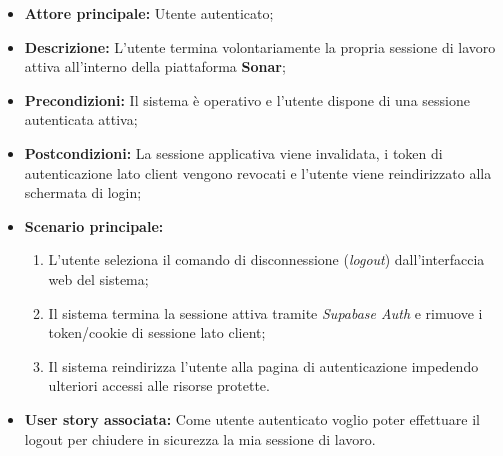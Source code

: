 \begin{itemize}
    \item \textbf{Attore principale:} Utente autenticato;
    \item \textbf{Descrizione:} L'utente termina volontariamente la propria sessione di lavoro attiva all'interno della piattaforma \textbf{Sonar};
    \item \textbf{Precondizioni:} Il sistema è operativo e l'utente dispone di una sessione autenticata attiva;
    \item \textbf{Postcondizioni:} La sessione applicativa viene invalidata, i token di autenticazione lato client vengono revocati e l'utente viene reindirizzato alla schermata di login;
    \item \textbf{Scenario principale:}
    \begin{enumerate}
        \item L'utente seleziona il comando di disconnessione (\textit{logout}) dall'interfaccia web del sistema;
        \item Il sistema termina la sessione attiva tramite \textit{Supabase Auth} e rimuove i token/cookie di sessione lato client;
        \item Il sistema reindirizza l'utente alla pagina di autenticazione impedendo ulteriori accessi alle risorse protette.
    \end{enumerate}
    \item \textbf{User story associata:} Come utente autenticato voglio poter effettuare il logout per chiudere in sicurezza la mia sessione di lavoro.
\end{itemize}